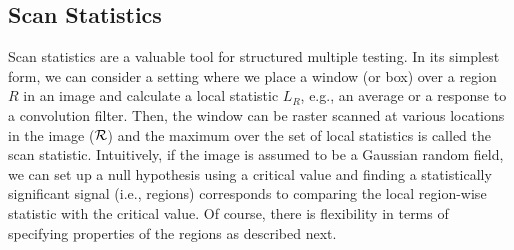 \subsection{Scan Statistics}
Scan statistics are a valuable tool for structured multiple testing.
In its simplest form, we can consider a setting where we place a window (or box) over a region $R$ in an image and calculate 
a local statistic $L_R$, e.g., an average or a response to a convolution filter. 
Then, the window can be raster scanned at various locations in the image ($\mathcal{R}$) and the maximum 
over the set of local statistics is called the scan statistic. 
Intuitively, if the image is assumed to be a Gaussian random field, we can set up a null hypothesis using a
critical value and finding a statistically significant signal (i.e., regions) corresponds to comparing 
the local region-wise statistic with the critical value.  
Of course, there is flexibility in terms of specifying properties of the regions as described next. 
 
